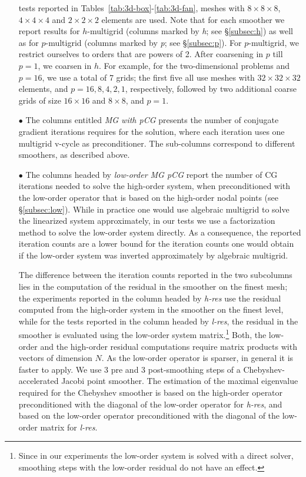 \documentclass[smallcondensed,final]{svjour3}     %
\begin{document}
\begin{itemize}
    tests reported in Tables~\ref{tab:3d-box}-\ref{tab:3d-fan}, meshes
    with $8\times8\times8$, $4\times4\times4$ and $2\times2\times2$
    elements are used.  Note that for each smoother we report results
    for $h$-multigrid (columns marked by \emph{h}; see
    \S\ref{subsec:h}) as well as for $p$-multigrid (columns marked by
    \emph{p}; see \S\ref{subsec:p}). For $p$-multigrid, we restrict
    ourselves to orders that are powers of 2. After coarsening in $p$
    till $p=1$, we coarsen in $h$. For example, for the
    two-dimensional problems and $p=16$, we use a total of 7 grids;
    the first five all use meshes with $32\times32\times32$ elements,
    and $p=16,8,4,2,1$, respectively, followed by two additional
    coarse grids of size $16\times16$ and $8\times8$, and $p=1$.
\item[$\bullet$] The columns entitled \emph{MG with pCG} presents the
  number of conjugate gradient iterations requires for the solution,
  where each iteration uses one multigrid v-cycle as preconditioner.
  The sub-columns correspond to different smoothers, as described
  above.
\item[$\bullet$] The columns headed by \emph{low-order MG pCG} report
  the number of CG iterations needed to solve the high-order system,
  when preconditioned with the low-order operator that is based on the
  high-order nodal points (see \S\ref{subsec:low}).  While in practice
  one would use algebraic multigrid to solve the linearized system
  approximately, in our tests we use a factorization method to solve
  the low-order system directly.  As a consequence, the reported
  iteration counts are a lower bound for the iteration counts one
  would obtain if the low-order system was inverted approximately by
  algebraic multigrid.

  The difference between the iteration counts reported in the two
  subcolumns lies in the computation of the residual in the smoother
  on the finest mesh; the experiments reported in the column headed by
  \emph{h-res} use the residual computed from the high-order system in
  the smoother on the finest level, while for the tests reported in
  the column headed by \emph{l-res}, the residual in the smoother is
  evaluated using the low-order system matrix.\footnote{Since in our
    experiments the low-order system is solved with a direct solver,
    smoothing steps with the low-order residual do not have an
    effect.}  Both, the low-order and the high-order residual
  computations require matrix products with vectors of dimension
  $N$. As the low-order operator is sparser, in general it is faster
  to apply.  We use 3 pre and 3 post-smoothing steps of a
  Chebyshev-accelerated Jacobi point smoother.  The estimation of the
  maximal eigenvalue required for the Chebyshev smoother is based on
  the high-order operator preconditioned with the diagonal of the
  low-order operator for \emph{h-res}, and based on the low-order
  operator preconditioned with the diagonal of the low-order matrix
  for \emph{l-res}.
\end{itemize}
\end{document}
